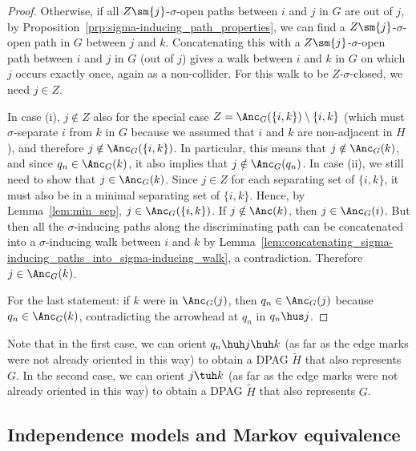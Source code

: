 \begin{proof}
  Otherwise, if all $Z\sm\{j\}$-$\sigma$-open paths between $i$ and $j$ in $G$ are out of $j$,
  by Proposition~\ref{prp:sigma-inducing_path_properties}, we can find a $Z \sm \{j\}$-$\sigma$-open path in $G$ between $j$ and $k$.
  Concatenating this with a $Z\sm\{j\}$-$\sigma$-open path between $i$ and $j$ in $G$ (out of $j$) gives a walk between $i$ and $k$ in $G$ on which $j$ occurs exactly once, again as a non-collider.
  For this walk to be $Z$-$\sigma$-closed, we need $j \in Z$.

  In case (i), $j \notin Z$ also for the special case $Z = \Anc_G(\{i,k\}) \setminus \{i,k\}$ (which must $\sigma$-separate $i$ from $k$ in $G$ because we assumed that $i$ and $k$ are non-adjacent in $H$), and therefore $j \notin \Anc_G(\{i,k\})$.
  In particular, this means that $j \notin \Anc_G(k)$, and since $q_n \in \Anc_G(k)$, it also implies that $j \notin \Anc_G(q_n)$. 
  In case (ii), we still need to show that $j \in \Anc_G(k)$.
  Since $j \in Z$ for each separating set of $\{i,k\}$, it must also be in a minimal separating set of $\{i,k\}$. 
  Hence, by Lemma~\ref{lem:min_sep}, $j \in \Anc_G(\{i,k\})$. 
  If $j \notin \Anc(k)$, then $j \in \Anc_G(i)$. 
  But then all the $\sigma$-inducing paths along the discriminating path can be concatenated into a $\sigma$-inducing walk between $i$ and $k$ by Lemma~\ref{lem:concatenating_sigma-inducing_paths_into_sigma-inducing_walk}, a contradiction.
  Therefore $j \in \Anc_G(k)$.

  For the last statement: if $k$ were in $\Anc_G(j)$, then $q_n \in \Anc_G(j)$ because $q_n \in \Anc_G(k)$, contradicting the arrowhead at $q_n$ in $q_n \hus j$.
\end{proof}
Note that in the first case, we can orient $q_n \huh j \huh k$ (as far as the edge marks were not already oriented in this way) to obtain a DPAG $\tilde{H}$ that also represents $G$. 
In the second case, we can orient $j \tuh k$ (as far as the edge marks were not already oriented in this way) to obtain a DPAG $\tilde{H}$ that also represents $G$.

\subsection{Independence models and Markov equivalence}

